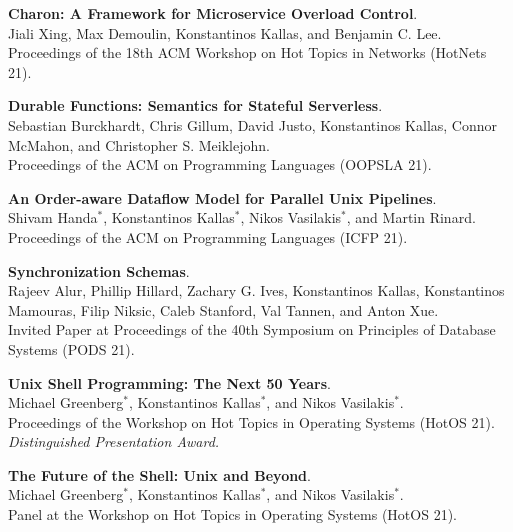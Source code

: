 \begin{minipage}{\textwidth}
\textbf{Charon: A Framework for Microservice Overload Control}. \\
Jiali Xing, Max Demoulin, Konstantinos Kallas, and Benjamin C. Lee. \\
Proceedings of the 18th ACM Workshop on Hot Topics in Networks (HotNets 21).
\end{minipage}

\begin{minipage}{\textwidth}
\textbf{Durable Functions: Semantics for Stateful Serverless}. \\
Sebastian Burckhardt, Chris Gillum, David Justo, Konstantinos Kallas, Connor McMahon, and Christopher S. Meiklejohn. \\
Proceedings of the ACM on Programming Languages (OOPSLA 21).
\end{minipage}

\begin{minipage}{\textwidth}
\textbf{An Order-aware Dataflow Model for Parallel Unix Pipelines}. \\
Shivam Handa$^*$, Konstantinos Kallas$^*$, Nikos Vasilakis$^*$, and Martin Rinard. \\
Proceedings of the ACM on Programming Languages (ICFP 21).
\end{minipage}

\begin{minipage}{\textwidth}
\textbf{Synchronization Schemas}. \\
Rajeev Alur, Phillip Hillard, Zachary G. Ives, Konstantinos Kallas, Konstantinos Mamouras, Filip Niksic, Caleb Stanford, Val Tannen, and Anton Xue. \\
Invited Paper at Proceedings of the 40th Symposium on Principles of Database Systems (PODS 21).
\end{minipage}

\begin{minipage}{\textwidth}
\textbf{Unix Shell Programming: The Next 50 Years}. \\
Michael Greenberg$^*$, Konstantinos Kallas$^*$, and Nikos Vasilakis$^*$. \\
Proceedings of the Workshop on Hot Topics in Operating Systems (HotOS 21).\\
 \emph{Distinguished Presentation Award.}
\end{minipage}

\begin{minipage}{\textwidth}
\textbf{The Future of the Shell: Unix and Beyond}. \\
Michael Greenberg$^*$, Konstantinos Kallas$^*$, and Nikos Vasilakis$^*$. \\
Panel at the Workshop on Hot Topics in Operating Systems (HotOS 21).
\end{minipage}


